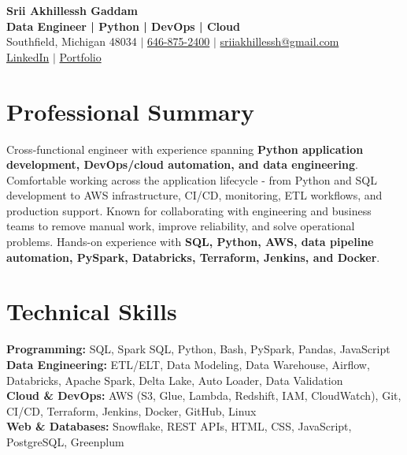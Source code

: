 \documentclass[letterpaper,10pt]{article}
\begin{document}
\fontsize{9.35pt}{10.45pt}\selectfont

\begin{center}
    {\LARGE \textbf{Srii Akhillessh Gaddam}} \\[-1pt]
    \textbf{Data Engineer | Python | DevOps | Cloud} \\[2pt]
    Southfield, Michigan 48034 $|$
    \href{tel:6468752400}{646-875-2400} $|$
    \href{mailto:sriiakhillessh@gmail.com}{sriiakhillessh@gmail.com} \\[1pt]
    \href{https://www.linkedin.com/in/srii-akhiilessh-gaddam-b48668191/}{LinkedIn} $|$
    \href{https://sriiakhillesshg.github.io/portfolio/}{Portfolio}
\end{center}
\vspace{-8pt}

\section{Professional Summary}
\small{Cross-functional engineer with experience spanning \textbf{Python application development, DevOps/cloud automation, and data engineering}. Comfortable working across the application lifecycle - from Python and SQL development to AWS infrastructure, CI/CD, monitoring, ETL workflows, and production support. Known for collaborating with engineering and business teams to remove manual work, improve reliability, and solve operational problems. Hands-on experience with \textbf{SQL, Python, AWS, data pipeline automation, PySpark, Databricks, Terraform, Jenkins, and Docker}.}

\section{Technical Skills}
\small{
\textbf{Programming:} SQL, Spark SQL, Python, Bash, PySpark, Pandas, JavaScript \\
\textbf{Data Engineering:} ETL/ELT, Data Modeling, Data Warehouse, Airflow, Databricks, Apache Spark, Delta Lake, Auto Loader, Data Validation \\
\textbf{Cloud \& DevOps:} AWS (S3, Glue, Lambda, Redshift, IAM, CloudWatch), Git, CI/CD, Terraform, Jenkins, Docker, GitHub, Linux \\
\textbf{Web \& Databases:} Snowflake, REST APIs, HTML, CSS, JavaScript, PostgreSQL, Greenplum
}
\end{document}
